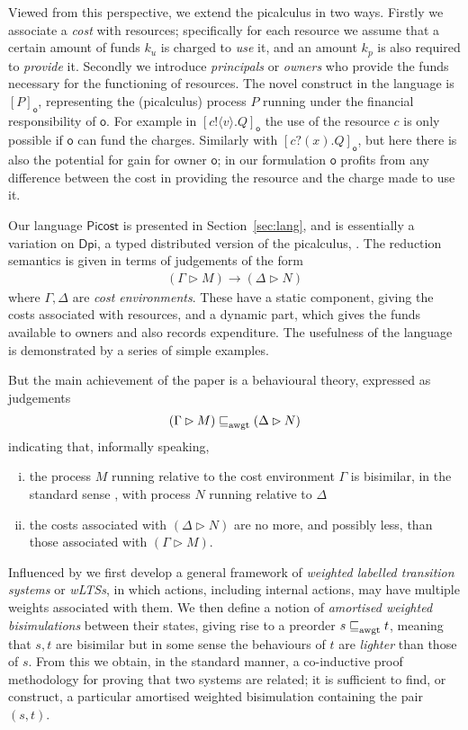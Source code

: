 \documentclass{LMCS}
\newcommand{\pfn}[1]{\mathsf{#1}}  \newcommand{\cfn}[1]{\mathsf{#1}}  \newcommand{\ownfnt}[1]{{\mathsf{#1}}}
\newcommand{\DPI}{\ensuremath{\pfn{Dpi}}\xspace}
\newcommand{\picost}{\ensuremath{\pfn{Picost}}\xspace}
\newcommand{\with}{\mathbin \rhd}
\newcommand{\aamort}[1]{\mathrel{\sqsubseteq_{\rm awgt}^{#1}}}
\newcommand{\pa}[1]{\!\left(#1\right)}
\newcommand{\pc}[1]{\langle#1\rangle}
\newcommand{\Cloc}[2]{[#1]_{\ownfnt{#2}}}
\newcommand{\smalleval}{\longrightarrow}  \newcommand{\csmalleval}[1]{\longrightarrow^{#1}}
\begin{document}
Viewed from this perspective, we extend the picalculus in two ways.
Firstly we associate a \emph{cost} with resources; specifically for
each resource we assume that a certain amount of funds $k_u$ is
charged to \emph{use} it, and an amount $k_p$ is also required to
\emph{provide} it. Secondly we introduce \emph{principals} or \emph{owners}
who provide the funds necessary for the functioning of resources. 
The novel construct in the language is $\Cloc{P}{o}$, representing
the (picalculus) process $P$ running under the financial responsibility 
of $\ownfnt o$. For example in $\Cloc{c!\pc{v}.Q}{o}$ the use of the resource 
$c$ is only possible if $\ownfnt o$ can fund the charges. Similarly with
 $\Cloc{c?\pa{x}.Q}{o}$, but here there is also the potential for gain
for owner $\ownfnt o$; in our formulation $\ownfnt o$ profits from 
any difference between the cost in providing the resource and the 
charge made to use it. 

Our language \picost is presented in Section~\ref{sec:lang}, and is essentially 
a variation on \DPI, a typed distributed version of the picalculus, \cite{dpibook}.
The reduction semantics is given in terms of judgements of the form
\begin{align*}
  (\Gamma \with M) \smalleval (\Delta \with N)
\end{align*}
where $\Gamma,\Delta$ are \emph{cost environments}. These have a static component, giving
the costs associated with resources, and a dynamic part, which gives the funds available to owners 
and also records expenditure. The usefulness of the language is demonstrated by a series of 
simple examples. 

But the main achievement of the paper is a  behavioural theory, expressed as judgements
\begin{align}\label{eq:judge}
  (\Gamma \with M) \aamort{} (\Delta \with N) 
\end{align}
indicating that, informally speaking,
\begin{enumerate}[(i)]
\item the process $M$ running relative to the cost environment $\Gamma$ is bisimilar, in the
standard sense \cite{ccs}, with process $N$ running relative to $\Delta$

\item the costs associated with $(\Delta \with N)$ are no more, and possibly less,  than those
associated with $(\Gamma \with M)$.
\end{enumerate}


 \noindent Influenced by \cite{astrid} we first develop a general framework of
\emph{weighted labelled transition systems} or \emph{wLTSs}, in which
actions, including internal actions, may have multiple weights
associated with them. We then define a notion of \emph{amortised
  weighted bisimulations} between their states, giving rise to a
preorder $s \aamort{} t$, meaning that $s, t$ are bisimilar but in some
sense the behaviours of $t$ are \emph{lighter} than those of $s$. From
this we obtain, in the standard manner, a co-inductive proof
methodology for proving that two systems are related; it is sufficient
to find, or construct, a particular amortised weighted bisimulation 
containing the pair $(s,t)$. 
\end{document}
